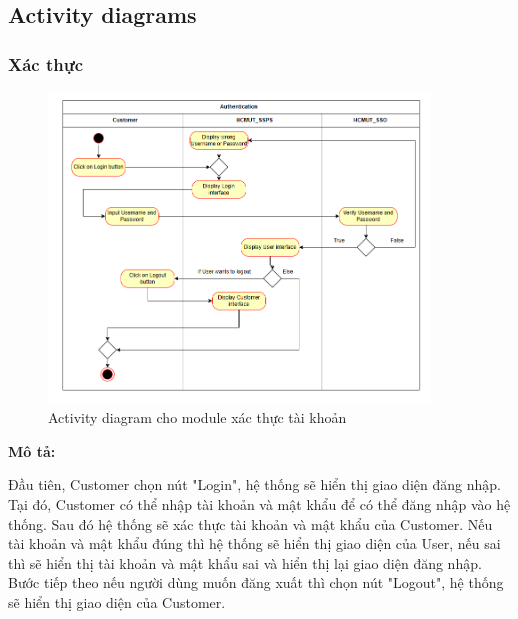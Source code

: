 \subsection{Activity diagrams}
\subsubsection{Xác thực}
\begin{figure}[H]
    \begin{center}
        \includegraphics[width=0.9\textwidth]{Images/System Modelling/Authen_Activity.png}
        \caption{Activity diagram cho module xác thực tài khoản}
        \label{fig:arch}
    \end{center}
\end{figure}
\textbf{Mô tả:}\par
Đầu tiên, Customer chọn nút "Login", hệ thống sẽ hiển thị giao diện đăng nhập. Tại đó, Customer có thể nhập tài khoản và mật khẩu để có thể đăng nhập vào hệ thống. Sau đó hệ thống sẽ xác thực tài khoản và mật khẩu của Customer. Nếu tài khoản và mật khẩu đúng thì hệ thống sẽ hiển thị giao diện của User, nếu sai thì sẽ hiển thị tài khoản và mật khẩu sai và hiển thị lại giao diện đăng nhập. Bước tiếp theo nếu người dùng muốn đăng xuất thì chọn nút "Logout", hệ thống sẽ hiển thị giao diện của Customer.

